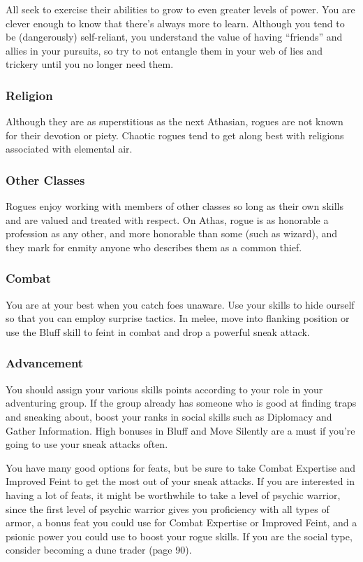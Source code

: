 All seek to exercise their abilities to grow to even greater levels of power. You are clever enough to know that there's always more to learn. Although you tend to be (dangerously) self-reliant, you understand the value of having ``friends'' and allies in your pursuits, so try to not entangle them in your web of lies and trickery until you no longer need them.

\subsubsection{Religion}

Although they are as superstitious as the next Athasian, rogues are not known for their devotion or piety. Chaotic rogues tend to get along best with religions associated with elemental air.

\subsubsection{Other Classes}

Rogues enjoy working with members of other classes so long as their own skills and are valued and treated with respect. On Athas, rogue is as honorable a profession as any other, and more honorable than some (such as
wizard), and they mark for enmity anyone who describes them as a common thief.

\subsubsection{Combat}

You are at your best when you catch foes unaware. Use your skills to hide ourself so that you can employ surprise tactics. In melee, move into flanking position or use the Bluff skill to feint in combat and drop a powerful sneak attack.

\subsubsection{Advancement}

You should assign your various skills points according to your role in your adventuring group. If the group already has someone who is good at finding traps and sneaking about, boost your ranks in social skills such as Diplomacy and Gather Information. High bonuses in Bluff and Move Silently are a must if you're going to use your sneak attacks often.

You have many good options for feats, but be sure to take Combat Expertise and Improved Feint to get the most out of your sneak attacks. If you are interested in having a lot of feats, it might be worthwhile to take a level of psychic warrior, since the first level of psychic warrior gives you proficiency with all types of armor, a bonus feat you could use for Combat Expertise or Improved Feint, and a psionic power you could use to boost your rogue skills. If you are the social type, consider becoming a dune trader (page 90).

